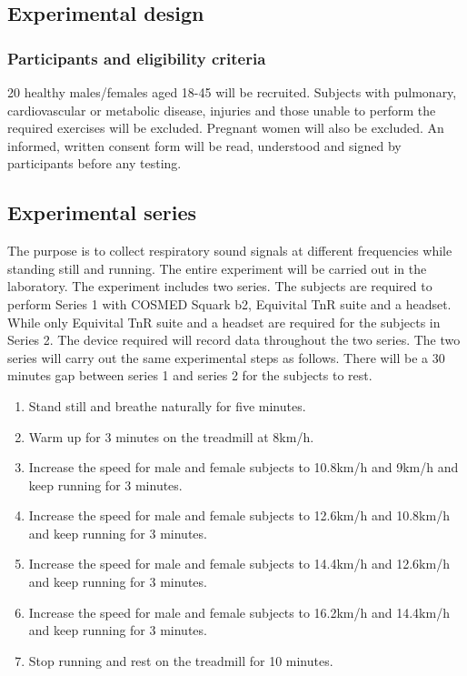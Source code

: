 \subsection{Experimental design}

\subsubsection{Participants and eligibility criteria}
20 healthy males/females aged 18-45 will be recruited. Subjects with pulmonary, cardiovascular or metabolic disease, injuries and those unable to perform the required exercises will be excluded. Pregnant women will also be excluded. An informed, written consent form will be read, understood and signed by participants before any testing. 

\subsection{Experimental series}
The purpose is to collect respiratory sound signals at different frequencies while standing still and running. The entire experiment will be carried out in the laboratory. The experiment includes two series. The subjects are required to perform Series 1 with COSMED Squark b2, Equivital TnR suite and a headset. While only Equivital TnR suite and a headset are required for the subjects in Series 2. The device required will record data throughout the two series. The two series will carry out the same experimental steps as follows. There will be a 30 minutes gap between series 1 and series 2 for the subjects to rest.

\begin{enumerate}
\item Stand still and breathe naturally for five minutes.
\item Warm up for 3 minutes on the treadmill at 8km/h.
\item Increase the speed for male and female subjects to 10.8km/h and 9km/h and keep running for 3 minutes.
\item Increase the speed for male and female subjects to 12.6km/h and 10.8km/h and keep running for 3 minutes.
\item Increase the speed for male and female subjects to 14.4km/h and 12.6km/h and keep running for 3 minutes.
\item Increase the speed for male and female subjects to 16.2km/h and 14.4km/h and keep running for 3 minutes.
\item Stop running and rest on the treadmill for 10 minutes.
\end{enumerate}

